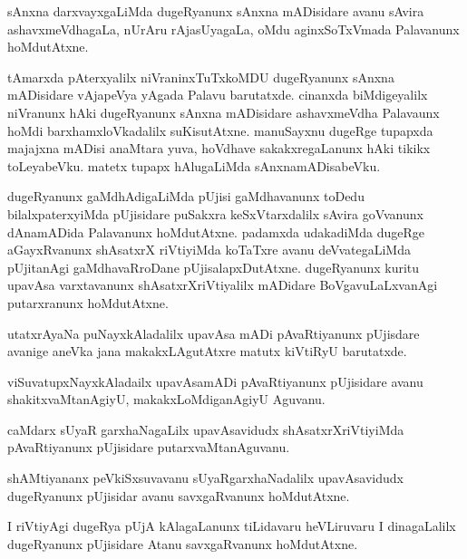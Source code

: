 \documentclass{article}
\begin{document}
\begin{mng}%
sAnxna darxvayxgaLiMda dugeRyanunx sAnxna mADisidare avanu sAvira ashavxmeVdhagaLa, nUrAru 
rAjasUyagaLa, oMdu aginxSoTxVmada Palavanunx hoMdutAtxne.
\end{mng}

\begin{mng}%
tAmarxda pAterxyalilx niVraninxTuTxkoMDU dugeRyanunx sAnxna mADisidare vAjapeVya yAgada Palavu 
barutatxde. cinanxda biMdigeyalilx niVranunx hAki dugeRyanunx sAnxna mADisidare ashavxmeVdha 
Palavaunx hoMdi barxhamxloVkadalilx suKisutAtxne. manuSayxnu dugeRge tupapxda majajxna mADisi 
anaMtara yuva, hoVdhave sakakxregaLanunx hAki tikikx toLeyabeVku. matetx tupapx hAlugaLiMda 
sAnxnamADisabeVku.
\end{mng}

\begin{mng}%
dugeRyanunx gaMdhAdigaLiMda pUjisi gaMdhavanunx toDedu bilalxpaterxyiMda pUjisidare puSakxra 
keSxVtarxdalilx sAvira goVvanunx dAnamADida Palavanunx hoMdutAtxne. padamxda udakadiMda dugeRge 
aGayxRvanunx shAsatxrX riVtiyiMda koTaTxre avanu deVvategaLiMda pUjitanAgi gaMdhavaRroDane 
pUjisalapxDutAtxne. dugeRyanunx kuritu upavAsa varxtavanunx shAsatxrXriVtiyalilx mADidare 
BoVgavuLaLxvanAgi putarxranunx hoMdutAtxne.
\end{mng}

\begin{mng}%
utatxrAyaNa puNayxkAladalilx upavAsa mADi pAvaRtiyanunx pUjisdare avanige aneVka jana 
makakxLAgutAtxre matutx kiVtiRyU barutatxde.
\end{mng}

\begin{mng}%
viSuvatupxNayxkAladailx upavAsamADi pAvaRtiyanunx pUjisidare avanu shakitxvaMtanAgiyU, 
makakxLoMdiganAgiyU Aguvanu.
\end{mng}

\begin{mng}%
caMdarx sUyaR garxhaNagaLilx upavAsavidudx shAsatxrXriVtiyiMda pAvaRtiyanunx pUjisidare 
putarxvaMtanAguvanu.
\end{mng}

\begin{mng}%
shAMtiyananx peVkiSxsuvavanu sUyaRgarxhaNadalilx upavAsavidudx dugeRyanunx pUjisidar avanu 
savxgaRvanunx hoMdutAtxne.
\end{mng}

\begin{mng}%
I riVtiyAgi dugeRya pUjA kAlagaLanunx tiLidavaru heVLiruvaru I dinagaLalilx dugeRyanunx pUjisidare 
Atanu savxgaRvanunx hoMdutAtxne.
\end{mng}
\end{document}
